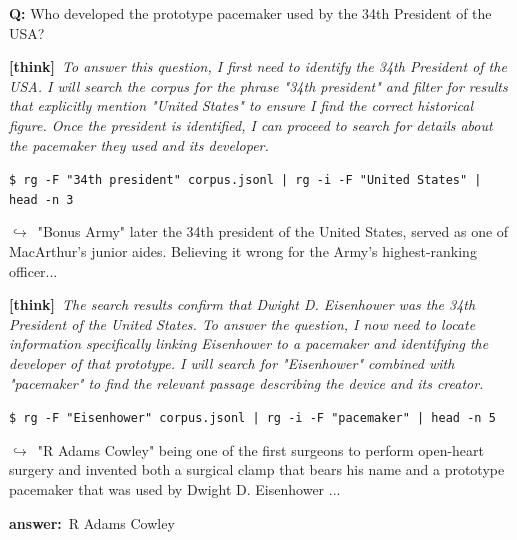 \documentclass{article} %
\newcommand{\thk}[1]{{\footnotesize\textcolor{violet!75!black}{\textbf{[think]}}\ \textit{#1}\par}}
\newcommand{\cmd}[1]{{\footnotesize\texttt{\textcolor{blue!35!black}{\$\ #1}}\par}}
\newcommand{\retr}[1]{{\footnotesize\textcolor{black!65}{\quad$\hookrightarrow$\ #1}\par}}
\newcommand{\ans}[1]{{\footnotesize\textbf{answer:}\ #1\par}}
\begin{document}
\begin{sftbox}[label={ex:sft-pacemaker},title={\textsc{compositional (2 hop)}}]
\textbf{Q:} Who developed the prototype pacemaker used by the 34th President of the USA?\\[1pt]
  \thk{To answer this question, I first need to identify the 34th President of the USA. I will search the corpus for the phrase "34th president" and filter for results that explicitly mention "United States" to ensure I find the correct historical figure. Once the president is identified, I can proceed to search for details about the pacemaker they used and its developer.}
  \cmd{rg -F "34th president" corpus.jsonl | rg -i -F "United States" | head -n 3}
  \retr{"Bonus Army" later the 34th president of the United States, served as one of MacArthur's junior aides. Believing it wrong for the Army's highest-ranking officer...}
  \thk{The search results confirm that Dwight D. Eisenhower was the 34th President of the United States. To answer the question, I now need to locate information specifically linking Eisenhower to a pacemaker and identifying the developer of that prototype. I will search for "Eisenhower" combined with "pacemaker" to find the relevant passage describing the device and its creator.}
  \cmd{rg -F "Eisenhower" corpus.jsonl | rg -i -F "pacemaker" | head -n 5}
  \retr{"R Adams Cowley" being one of the first surgeons to perform open-heart surgery and invented both a surgical clamp that bears his name and a prototype pacemaker that was used by Dwight D. Eisenhower ...}
  \ans{R Adams Cowley}
\end{sftbox}\medskip
\end{document}
